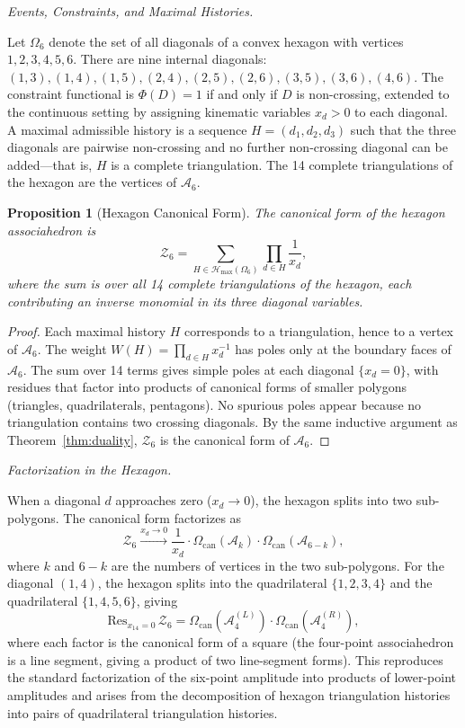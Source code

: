 \documentclass[11pt]{article}
\theoremstyle{plain}
\newtheorem{proposition}[theorem]{Proposition}
\theoremstyle{definition}
\theoremstyle{remark}
\newcommand{\Phif}{\Phi}
\newcommand{\OmKS}{\Omega}
\newcommand{\CF}{\Omega_{\mathrm{can}}}
\newcommand{\Hmax}{\mathcal{H}_{\max}}
\begin{document}
\medskip\noindent\textit{Events, Constraints, and Maximal Histories.}

Let $\OmKS_6$ denote the set of all diagonals of a convex hexagon with vertices $1, 2, 3, 4, 5, 6$. There are nine internal diagonals: $(1,3), (1,4), (1,5), (2,4), (2,5), (2,6), (3,5), (3,6), (4,6)$. The constraint functional is $\Phif(D) = 1$ if and only if $D$ is non-crossing, extended to the continuous setting by assigning kinematic variables $x_d > 0$ to each diagonal. A maximal admissible history is a sequence $H = (d_1, d_2, d_3)$ such that the three diagonals are pairwise non-crossing and no further non-crossing diagonal can be added---that is, $H$ is a complete triangulation. The 14 complete triangulations of the hexagon are the vertices of $\mathcal{A}_6$.

\begin{proposition}[Hexagon Canonical Form]
\label{prop:hexagon}
The canonical form of the hexagon associahedron is
\begin{equation}
\label{eq:hexagon-Z}
  \mathcal{Z}_6 = \sum_{H \in \Hmax(\OmKS_6)} \prod_{d \in H} \frac{1}{x_d},
\end{equation}
where the sum is over all 14 complete triangulations of the hexagon, each contributing an inverse monomial in its three diagonal variables.
\end{proposition}

\begin{proof}
Each maximal history $H$ corresponds to a triangulation, hence to a vertex of $\mathcal{A}_6$. The weight $W(H) = \prod_{d \in H} x_d^{-1}$ has poles only at the boundary faces of $\mathcal{A}_6$. The sum over 14 terms gives simple poles at each diagonal $\{x_d = 0\}$, with residues that factor into products of canonical forms of smaller polygons (triangles, quadrilaterals, pentagons). No spurious poles appear because no triangulation contains two crossing diagonals. By the same inductive argument as Theorem~\ref{thm:duality}, $\mathcal{Z}_6$ is the canonical form of $\mathcal{A}_6$.
\end{proof}

\medskip\noindent\textit{Factorization in the Hexagon.}

When a diagonal $d$ approaches zero ($x_d \to 0$), the hexagon splits into two sub-polygons. The canonical form factorizes as
\[
  \mathcal{Z}_6 \xrightarrow{x_d \to 0} \frac{1}{x_d} \cdot \CF(\mathcal{A}_{k}) \cdot \CF(\mathcal{A}_{6-k}),
\]
where $k$ and $6-k$ are the numbers of vertices in the two sub-polygons. For the diagonal $(1,4)$, the hexagon splits into the quadrilateral $\{1,2,3,4\}$ and the quadrilateral $\{1,4,5,6\}$, giving
\[
  \mathrm{Res}_{x_{14}=0}\,\mathcal{Z}_6 = \CF(\mathcal{A}_4^{(L)}) \cdot \CF(\mathcal{A}_4^{(R)}),
\]
where each factor is the canonical form of a square (the four-point associahedron is a line segment, giving a product of two line-segment forms). This reproduces the standard factorization of the six-point amplitude into products of lower-point amplitudes and arises from the decomposition of hexagon triangulation histories into pairs of quadrilateral triangulation histories.
\end{document}
